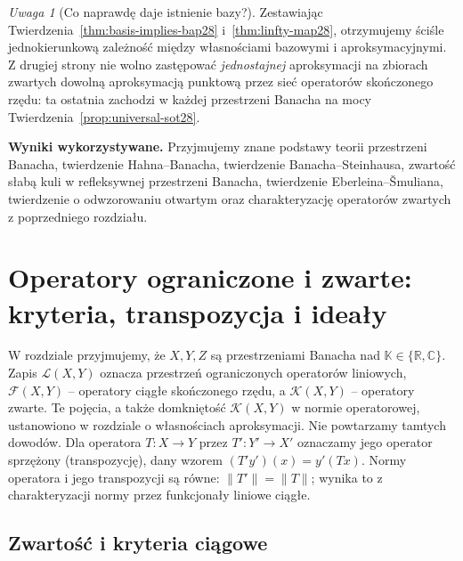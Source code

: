 \documentclass[11pt,a4paper]{article}
\numberwithin{equation}{section}
\theoremstyle{plain}
\theoremstyle{definition}
\theoremstyle{remark}
\newtheorem{uwaga}[twierdzenie]{Uwaga}
\newcommand{\R}{\mathbb R}
\newcommand{\C}{\mathbb C}
\newcommand{\K}{\mathbb K}
\begin{document}
\begin{uwaga}[Co naprawdę daje istnienie bazy?]
\label{rem:recap28}
Zestawiając Twierdzenia~\ref{thm:basis-implies-bap28}
i~\ref{thm:linfty-map28}, otrzymujemy ściśle
jednokierunkową zależność między własnościami bazowymi
i aproksymacyjnymi. Z drugiej strony nie wolno
zastępować \emph{jednostajnej} aproksymacji na
zbiorach zwartych dowolną aproksymacją punktową przez
sieć operatorów skończonego rzędu: ta ostatnia zachodzi
w każdej przestrzeni Banacha na mocy
Twierdzenia~\ref{prop:universal-sot28}.
\end{uwaga}


\setcounter{section}{28}
\noindent\textbf{Wyniki wykorzystywane.} Przyjmujemy znane podstawy teorii przestrzeni Banacha, twierdzenie Hahna--Banacha, twierdzenie Banacha--Steinhausa, zwartość słabą kuli w refleksywnej przestrzeni Banacha, twierdzenie Eberleina--\v Smuliana, twierdzenie o odwzorowaniu otwartym oraz charakteryzację operatorów zwartych z poprzedniego rozdziału.
\par\medskip
\section{Operatory ograniczone i zwarte: kryteria, transpozycja i ideały}
\label{sec:operatory29}

W rozdziale przyjmujemy, że $X,Y,Z$ są przestrzeniami Banacha nad
$\K\in\{\R,\C\}$. Zapis $\mathcal L(X,Y)$ oznacza przestrzeń
ograniczonych operatorów liniowych, $\mathcal F(X,Y)$ -- operatory
ciągłe skończonego rzędu, a $\mathcal K(X,Y)$ -- operatory zwarte.
Te pojęcia, a także domkniętość $\mathcal K(X,Y)$ w normie operatorowej,
ustanowiono w rozdziale o własnościach aproksymacji. Nie powtarzamy
tamtych dowodów. Dla operatora $T:X\to Y$ przez $T':Y'\to X'$
oznaczamy jego operator sprzężony (transpozycję), dany wzorem
$(T'y')(x)=y'(Tx)$. Normy operatora i jego transpozycji są równe:
$\|T'\|=\|T\|$; wynika to z charakteryzacji normy przez
funkcjonały liniowe ciągłe.

\subsection{Zwartość i kryteria ciągowe}
\end{document}

